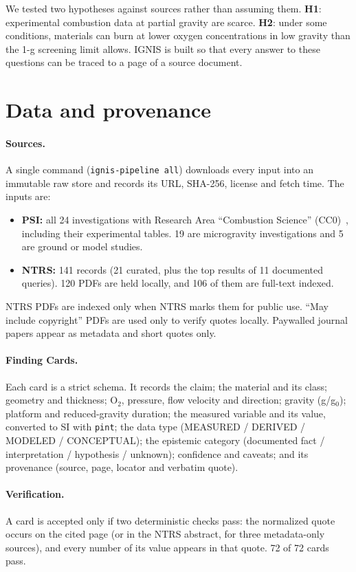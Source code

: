 \documentclass[10pt]{article}
\begin{document}
We tested two hypotheses against sources rather than assuming them.
\textbf{H1}: experimental combustion data at partial gravity are scarce.
\textbf{H2}: under some conditions, materials can burn at lower oxygen concentrations in low gravity than the 1-g
screening limit allows.
IGNIS is built so that every answer to these questions can be traced to a page of a source document.

\section{Data and provenance}
\paragraph{Sources.}
A single command (\texttt{ignis-pipeline all}) downloads every input into an immutable raw store and records its
URL, SHA-256, license and fetch time. The inputs are:
\begin{itemize}
\item \textbf{PSI:} all 24 investigations with Research Area ``Combustion Science'' (CC0)~\cite{psi},
including their experimental tables. 19 are microgravity investigations and 5 are ground or model studies.
\item \textbf{NTRS:} 141 records (21 curated, plus the top results of 11 documented queries). 120 PDFs are held
locally, and 106 of them are full-text indexed.
\end{itemize}
NTRS PDFs are indexed only when NTRS marks them for public use. ``May include copyright'' PDFs are used only to
verify quotes locally. Paywalled journal papers appear as metadata and short quotes only.

\paragraph{Finding Cards.}
Each card is a strict schema. It records the claim; the material and its class; geometry and thickness; O$_2$,
pressure, flow velocity and direction; gravity (g/g$_0$); platform and reduced-gravity duration; the measured
variable and its value, converted to SI with \texttt{pint}; the data type (MEASURED / DERIVED / MODELED /
CONCEPTUAL); the epistemic category (documented fact / interpretation / hypothesis / unknown); confidence and
caveats; and its provenance (source, page, locator and verbatim quote).

\paragraph{Verification.}
A card is accepted only if two deterministic checks pass: the normalized quote occurs on the cited page (or in the
NTRS abstract, for three metadata-only sources), and every number of its value appears in that quote. 72 of 72
cards pass.
\end{document}
